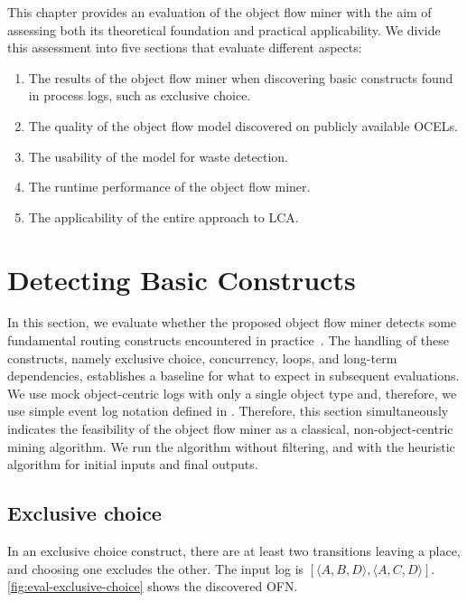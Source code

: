 This chapter provides an evaluation of the object flow miner with the aim of assessing both its theoretical foundation and practical applicability.
We divide this assessment into five sections that evaluate different aspects:
\begin{enumerate}
    \item
    The results of the object flow miner when discovering basic constructs found in process logs, such as exclusive choice.
    
    \item
    The quality of the object flow model discovered on publicly available OCELs.

    \item
    The usability of the model for waste detection.

    \item
    The runtime performance of the object flow miner.

    \item
    The applicability of the entire approach to LCA.
\end{enumerate}



\section{Detecting Basic Constructs}
\label{chap:detecting-basic-constructs}


In this section, we evaluate whether the proposed object flow miner detects some fundamental routing constructs encountered in practice~\autocite{van2004}.
The handling of these constructs, namely exclusive choice, concurrency, loops, and long-term dependencies, establishes a baseline for what to expect in subsequent evaluations.
We use mock object-centric logs with only a single object type and, therefore, we use simple event log notation defined in \autocite{van2016}.
Therefore, this section simultaneously indicates the feasibility of the object flow miner as a classical, non-object-centric mining algorithm.
We run the algorithm without filtering, and with the heuristic algorithm for initial inputs and final outputs.



\subsection{Exclusive choice}


In an exclusive choice construct, there are at least two transitions leaving a place, and choosing one excludes the other.
The input log is $[\langle A, B, D \rangle, \langle A, C, D \rangle]$.
\autoref{fig:eval-exclusive-choice} shows the discovered OFN.



